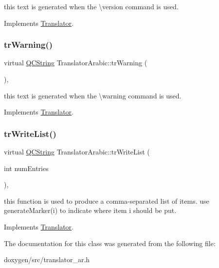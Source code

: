 this text is generated when the \textbackslash{}version command is used. 

Implements \mbox{\hyperlink{class_translator}{Translator}}.

\mbox{\label{class_translator_arabic_aff497d8b773ee4c2e8e2c395c6b130b0}} 
\subsubsection{\texorpdfstring{trWarning()}{trWarning()}}
{\footnotesize\ttfamily virtual \mbox{\hyperlink{class_q_c_string}{Q\+C\+String}} Translator\+Arabic\+::tr\+Warning (\begin{DoxyParamCaption}{ }\end{DoxyParamCaption})\hspace{0.3cm}{\ttfamily [inline]}, {\ttfamily [virtual]}}

this text is generated when the \textbackslash{}warning command is used. 

Implements \mbox{\hyperlink{class_translator}{Translator}}.

\mbox{\label{class_translator_arabic_ae18e9a21f88b459c24099e2517ba10d8}} 
\subsubsection{\texorpdfstring{trWriteList()}{trWriteList()}}
{\footnotesize\ttfamily virtual \mbox{\hyperlink{class_q_c_string}{Q\+C\+String}} Translator\+Arabic\+::tr\+Write\+List (\begin{DoxyParamCaption}\item[{int}]{num\+Entries }\end{DoxyParamCaption})\hspace{0.3cm}{\ttfamily [inline]}, {\ttfamily [virtual]}}

this function is used to produce a comma-\/separated list of items. use generate\+Marker(i) to indicate where item i should be put. 

Implements \mbox{\hyperlink{class_translator}{Translator}}.



The documentation for this class was generated from the following file\+:\begin{DoxyCompactItemize}
\item 
doxygen/src/translator\+\_\+ar.\+h\end{DoxyCompactItemize}
